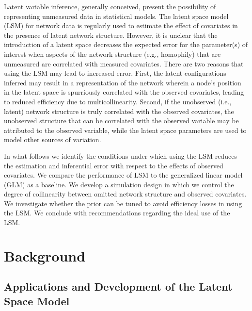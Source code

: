 \documentclass[12pt]{article}
\begin{document}
Latent variable inference, generally conceived, present the possibility of representing unmeasured data in statistical models. The latent space model (LSM) \cite{hoff2002latent} for network data is regularly used to estimate the effect of covariates in the presence of latent network structure. However, it is unclear that the introduction of a latent space decreases the expected error for the parameter(s) of interest when aspects of the network structure (e.g., homophily) that are unmeasured are correlated with measured covariates. There are two reasons that using the LSM may lead to increased error. First, the latent configurations inferred may result in a representation of the network wherein a node's position in the latent space is spurriously correlated with the observed covariates, leading to reduced efficiency due to multicollinearity. Second, if the unobserved (i.e., latent) network structure is truly correlated with the observed covariates, the unobserved structure that can be correlated with the observed variable may be attributed to the observed variable, while the latent space parameters are used to model other sources of variation. 

In what follows we identify the conditions under which using the LSM reduces the estimation and inferential error with respect to the effects of observed covariates. We compare the performance of LSM to the generalized linear model (GLM) as a baseline. We develop a simulation design in which we control the degree of collinearity between omitted network structure and observed covariates. We investigate whether the prior can be tuned to avoid efficiency losses in using the LSM. We conclude with recommendations regarding the ideal use of the LSM.

\section{Background}

\subsection{Applications and Development of the Latent Space Model}
\end{document}
